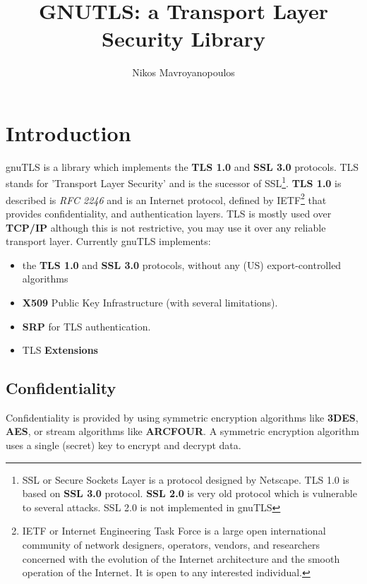 \documentclass{article}
\begin{document}
\title{GNUTLS: a Transport Layer Security Library}
\author{Nikos Mavroyanopoulos}
\maketitle

\tableofcontents
\newpage

\section{Introduction}
\par
gnuTLS is a library which implements the {\bf TLS 1.0} and {\bf SSL 3.0} protocols.
TLS stands for 'Transport Layer Security' and is the sucessor of SSL\footnote{
SSL or Secure Sockets Layer is a protocol designed by Netscape. TLS 1.0 is based on
{\bf SSL 3.0} protocol. {\bf SSL 2.0} is very old protocol which is vulnerable to several attacks. SSL 2.0 is not
implemented in gnuTLS}.
{\bf TLS 1.0} is described is {\it RFC 2246} and is an Internet protocol,
defined by IETF\footnote{IETF or Internet Engineering Task Force 
is a large open international community of network
designers, operators, vendors, and researchers concerned with the evolution of 
the Internet architecture and the smooth operation of the Internet. It is open to any interested individual.}
that provides confidentiality, and authentication layers. 
TLS is mostly used over {\bf TCP/IP} although this is not restrictive, you may
use it over any reliable transport layer.
Currently gnuTLS implements:
\begin{itemize}
 \item the {\bf TLS 1.0} and {\bf{ SSL 3.0}} protocols, without any (US) export-controlled algorithms
 \item {\bf X509} Public Key Infrastructure (with several limitations).
 \item {\bf SRP} for TLS authentication.
 \item TLS {\bf Extensions}
\end{itemize}

\subsection{Confidentiality}
\par
Confidentiality is provided by using symmetric encryption algorithms like {\bf 3DES}, {\bf AES}, or
stream algorithms like {\bf ARCFOUR}. A symmetric encryption algorithm uses a single (secret) key
to encrypt and decrypt data.
\end{document}
